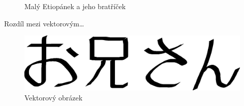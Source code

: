 \documentclass[11pt, a4paper]{article}
\begin{document}
\begin{figure}[ht]
{}
\caption{Malý Etiopánek a jeho bratříček}
\label{firstPicture}
\end{figure}

\newpage
Rozdíl mezi vektorovým\dots

\begin{figure}[ht]
\centering
\includegraphics[scale=0.4]{oniisan.eps}
\caption{Vektorový obrázek}
\label{secondPicture}
\end{figure}
\end{document}
